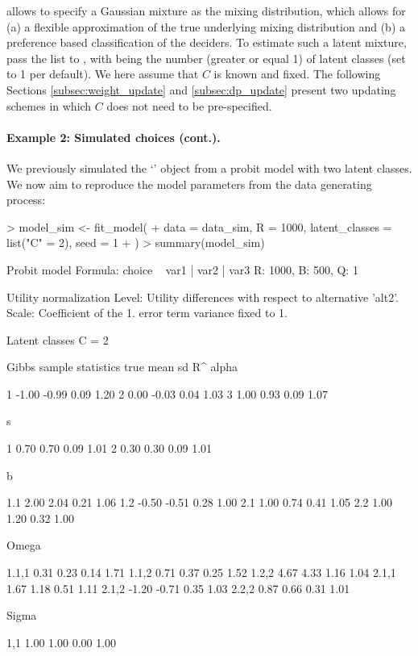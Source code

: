 \documentclass[article,shortnames]{jss}
\newcommand{\class}[1]{`\code{#1}'}
\newcommand{\fct}[1]{\code{#1()}}
\begin{document}
 allows to specify a Gaussian mixture as the mixing distribution, which allows for (a) a flexible approximation of the true underlying mixing distribution and (b) a preference based classification of the deciders. To estimate such a latent mixture, pass the list  to \fct{fit\_model}, with  being the number (greater or equal 1) of latent classes (set to 1 per default). We here assume that $C$ is known and fixed. The following Sections \ref{subsec:weight_update} and \ref{subsec:dp_update} present two updating schemes in which $C$ does not need to be pre-specified.

\paragraph{Example 2: Simulated choices (cont.).}

We previously simulated the \class{RprobitB\_data} object  from a probit model with two latent classes. We now aim to reproduce the model parameters from the data generating process:

\begin{Schunk}
\begin{Sinput}
> model_sim <- fit_model(
+    data = data_sim, R = 1000, latent_classes = list("C" = 2), seed = 1
+  )
> summary(model_sim)
\end{Sinput}
\begin{Soutput}
Probit model
Formula: choice ~ var1 | var2 | var3 
R: 1000, B: 500, Q: 1

Utility normalization
Level: Utility differences with respect to alternative 'alt2'.
Scale: Coefficient of the 1. error term variance fixed to 1.

Latent classes
C = 2 

Gibbs sample statistics
          true    mean      sd      R^
 alpha
                                      
     1   -1.00   -0.99    0.09    1.20
     2    0.00   -0.03    0.04    1.03
     3    1.00    0.93    0.09    1.07

 s
                                      
     1    0.70    0.70    0.09    1.01
     2    0.30    0.30    0.09    1.01

 b
                                      
   1.1    2.00    2.04    0.21    1.06
   1.2   -0.50   -0.51    0.28    1.00
   2.1    1.00    0.74    0.41    1.05
   2.2    1.00    1.20    0.32    1.00

 Omega
                                      
 1.1,1    0.31    0.23    0.14    1.71
 1.1,2    0.71    0.37    0.25    1.52
 1.2,2    4.67    4.33    1.16    1.04
 2.1,1    1.67    1.18    0.51    1.11
 2.1,2   -1.20   -0.71    0.35    1.03
 2.2,2    0.87    0.66    0.31    1.01

 Sigma
                                      
   1,1    1.00    1.00    0.00    1.00
\end{Soutput}
\end{Schunk}
\end{document}
